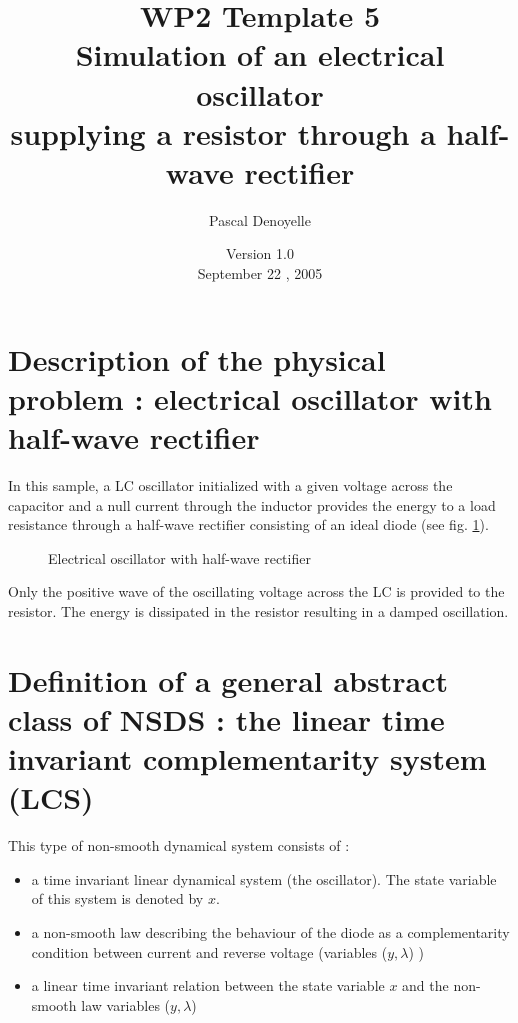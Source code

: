\documentclass[10pt]{article}
\begin{document}
\thispagestyle{empty}
\title{WP2 Template 5 \\Simulation of an electrical oscillator \\
supplying a resistor through a half-wave rectifier}
\author{Pascal Denoyelle}

\date{Version 1.0 \\
 September 22 , 2005}
\maketitle


\pagestyle{fancy}

\section{Description of the physical problem : electrical oscillator with half-wave rectifier}
In this sample, a LC oscillator initialized with a given voltage across the capacitor and a null current through
the inductor provides the energy
to a load resistance through a half-wave rectifier consisting of an ideal diode (see fig. \ref{fig-CircuitRLCD}).

\begin{figure}[hp]
\centerline{
  \scalebox{0.75}{
     
  }
}
\caption{Electrical oscillator with half-wave rectifier}
\label{fig-CircuitRLCD}
\end{figure}

Only the positive wave of the oscillating voltage across the LC is provided to the resistor. The energy is dissipated
in the resistor resulting in a damped oscillation.


\section{Definition of a general abstract class of NSDS : the linear time invariant complementarity system (LCS)}
\label{sec-def-NSDS}
This type of non-smooth dynamical system consists of :

\begin{itemize}
\item a time invariant linear dynamical system (the oscillator). The state variable of this system is denoted by $x$.
\item a non-smooth law describing the behaviour of the diode as a complementarity condition between current and
reverse voltage (variables ($y,\lambda$) )
\item a linear time invariant relation between the state variable $x$ and the non-smooth law
variables ($y,\lambda$)
\end{itemize}
\end{document}
